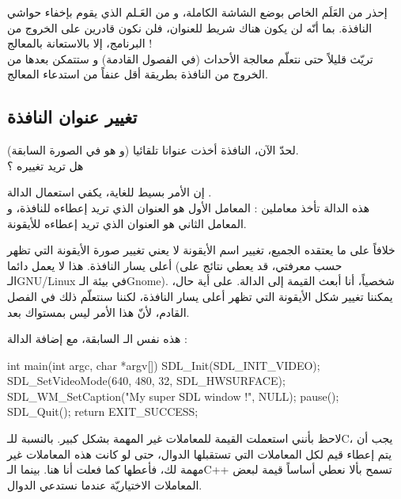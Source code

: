 \begin{warning}
إحذر من العَلَم 
الخاص بوضع الشاشة الكاملة، و من العَـلم 
الذي يقوم بإخفاء حواشي النافذة. بما أنّه لن يكون هناك شريط للعنوان، فلن نكون قادرين على الخروج من البرنامج، إلا بالاستعانة بالمعالج !\\
تريّث قليلاً حتى نتعلّم معالجة الأحداث (في الفصول القادمة) و ستتمكن بعدها من الخروج من النافذة بطريقة أقل عنفاً من استدعاء المعالج.
\end{warning}

\subsection{تغيير عنوان النافذة}

لحدّ الآن، النافذة أخذت عنوانا تلقائيا (و هو 
في الصورة السابقة).\\
هل تريد تغييره ؟

إن الأمر بسيط للغاية، يكفي استعمال الدالة
.\\
هذه الدالة تأخذ معاملين : المعامل الأول هو العنوان الذي تريد إعطاءه للنافذة، و المعامل الثاني هو العنوان الذي تريد إعطاءه للأيقونة.

خلافاً على ما يعتقده الجميع، تغيير اسم الأيقونة لا يعني تغيير صورة الأيقونة التي تظهر أعلى يسار النافذة. هذا لا يعمل دائما (حسب معرفتي، قد يعطي نتائج على الـ\textenglish{GNU/Linux}
في بيئة الـ\textenglish{Gnome}).
شخصياً، أنا أبعث القيمة
إلى الدالة. على أية حال، يمكننا تغيير شكل الأيقونة التي تظهر أعلى يسار النافذة، لكننا سنتعلّم ذلك في الفصل القادم، لأنّ هذا الأمر ليس بمستواك بعد.

هذه نفس الـ
السابقة، مع إضافة الدالة
 :

\begin{Csource}
int main(int argc, char *argv[])
{
	SDL_Init(SDL_INIT_VIDEO);
	SDL_SetVideoMode(640, 480, 32, SDL_HWSURFACE);
	SDL_WM_SetCaption("My super SDL window !", NULL);
	pause();
	SDL_Quit();
	return EXIT_SUCCESS;
}
\end{Csource}

\begin{information}
لاحظ بأنني استعملت القيمة 
للمعاملات غير المهمة بشكل كبير. بالنسبة للـ\textenglish{C}،
يجب أن يتم إعطاء قيم لكل المعاملات التي تستقبلها الدوال، حتى لو كانت هذه المعاملات غير مهمة لك، فأعطها
كما فعلت أنا هنا. بينما الـ\textenglish{C++}
تسمح بألا نعطي أساساً قيمة لبعض المعاملات الاختياريّة عندما نستدعي الدوال.
\end{information}

